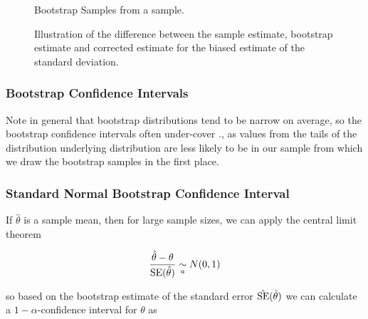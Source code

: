
\begin{figure}[!htb]
    \centering
    
    \caption{Bootstrap Samples from a sample.}
    \label{fig:bootstrap_samples}
\end{figure}

\begin{figure}[!htb]
    \centering
    
    \caption{Illustration of the difference between the sample estimate, bootstrap estimate and corrected estimate for the biased estimate of the standard deviation.}
    \label{fig:boots_corr}
\end{figure}

\subsubsection{Bootstrap Confidence Intervals\skipthis}
Note in general that bootstrap distributions tend to be narrow on average, so the bootstrap confidence intervals often under-cover \citep{tim15}.,
as values from the tails of the distribution underlying distribution are less likely to be in our sample from 
which we draw the bootstrap samples in the first place.


\subsubsection{Standard Normal Bootstrap Confidence Interval}
If $\hat{\theta}$ is a sample mean, then for large sample sizes, we can apply the central limit theorem

\begin{equation}
    \frac{\hat{\theta} - \theta}{\operatorname{SE}(\hat{\theta})} \underset{a}{\sim} N(0,1)
\end{equation}

so based on the bootstrap estimate of the standard error $\hat{\operatorname{SE}}(\hat{\theta})$ we can calculate a $1-\alpha$-confidence interval for $\theta$ as


